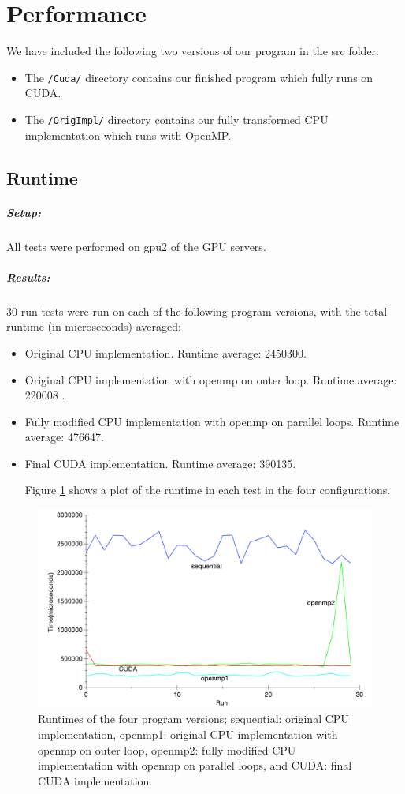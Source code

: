\section{Performance}
We have included the following two versions of our program in the src folder:
\begin{itemize}
\item The \verb!/Cuda/! directory contains our finished program which fully runs on CUDA.
\item The \verb!/OrigImpl/! directory contains our fully transformed CPU implementation which runs with OpenMP.
\end{itemize}
\subsection{Runtime}
\subparagraph{Setup:} All tests were performed on gpu2 of the GPU servers.


\subparagraph{Results:} 

30 run tests were run on each of the following program versions, with the total runtime (in microseconds) averaged:
\begin{itemize}
\item Original CPU implementation. Runtime average: 2450300.
\item Original CPU implementation with openmp on outer loop. Runtime average: 220008 .
\item Fully modified CPU implementation with openmp on parallel loops. Runtime average: 476647.
\item Final CUDA implementation. Runtime average: 390135.

Figure \ref{fig_res} shows a plot of the runtime in each test in the four configurations.
\end{itemize}
\begin{figure}[H]
\includegraphics[width=150mm]{results_plot} 
\caption{Runtimes of the four program versions; sequential: original CPU implementation, openmp1: original CPU implementation with openmp on outer loop, openmp2: fully modified CPU implementation with openmp on parallel loops, and CUDA: final CUDA implementation.}
\label{fig_res}
\end{figure}



